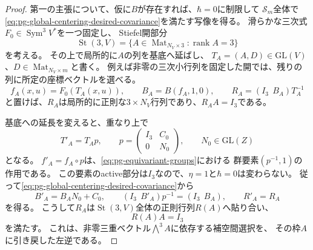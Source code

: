 \begin{proof}
第一の主張について、仮に$B$が存在すれば、$\hbar=0$に制限して
$\mathcal S_m$全体で\eqref{eq:pg-global-centering-desired-covariance}を満たす写像を得る。
滑らかな三次式$F_0\in\operatorname{Sym}^3V^*$を一つ固定し、
Stiefel開部分
\begin{equation}
 \operatorname{St}(3,V)
 =\{A\in\operatorname{Mat}_{N_V\times3}:\operatorname{rank}A=3\}
 \label{eq:pg-global-centering-stiefel-open}
\end{equation}
を考える。
その上で局所的に$A$の列を基底へ延ばし、
$T_A=(A,D)\in\mathrm{GL}(V)$、$D\in\operatorname{Mat}_{N_V\times m}$と書く。
例えば非零の三次小行列を固定した開では、残りの列に所定の座標ベクトルを選べる。
\begin{equation}
 f_A(x,u)=F_0(T_A(x,u)),\qquad
 B_A=B(f_A,1,0),\qquad
 R_A=(I_3\ \ B_A)T_A^{-1}
 \label{eq:pg-global-centering-stiefel-retraction}
\end{equation}
と置けば、$R_A$は局所的に正則な$3\times N_V$行列であり、$R_AA=I_3$である。

基底への延長を変えると、重なり上で
\begin{equation}
 T'_A=T_Ap,\qquad
 p=\begin{pmatrix}I_3&C_0\\0&N_0\end{pmatrix},\qquad
 N_0\in\mathrm{GL}(Z)
 \label{eq:pg-global-centering-frame-transition}
\end{equation}
となる。
$f'_A=f_A\circ p$は、\eqref{eq:pg-equivariant-groups}における
群要素$(p^{-1},1)$の作用である。
この要素のactive部分は$I_3$なので、$\eta=1$と$\hbar=0$は変わらない。
従って\eqref{eq:pg-global-centering-desired-covariance}から
\begin{equation}
 B'_A=B_AN_0+C_0,\qquad
 (I_3\ \ B'_A)p^{-1}=(I_3\ \ B_A),\qquad R'_A=R_A
 \label{eq:pg-global-centering-left-inverse-gluing}
\end{equation}
を得る。
こうして$R_A$は$\operatorname{St}(3,V)$全体の正則行列$R(A)$へ貼り合い、
\begin{equation}
 R(A)A=I_3
 \label{eq:pg-global-centering-impossible-left-inverse}
\end{equation}
を満たす。
これは、非零三重ベクトル$\bigwedge^3A$に依存する補空間選択を、
その枠$A$に引き戻した左逆である。


\end{proof}
